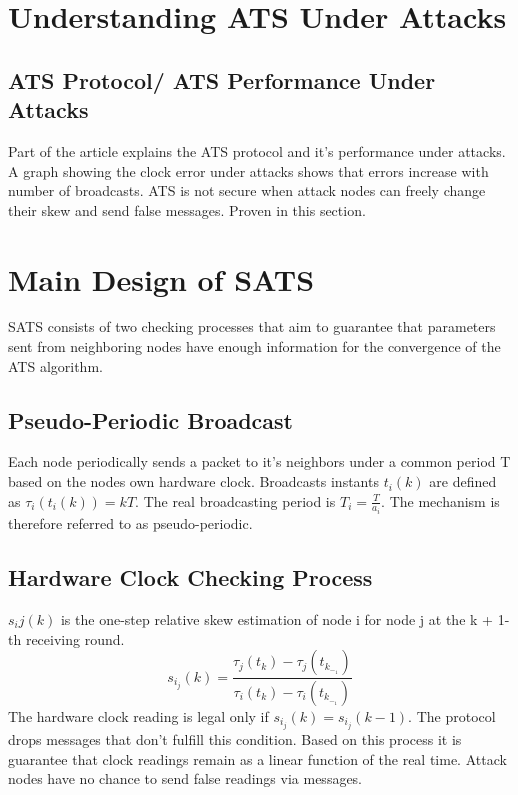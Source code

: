 \documentclass{article}
\begin{document}
\section{Understanding ATS Under Attacks}

\subsection{ATS Protocol/ ATS Performance Under Attacks}
Part of the article explains the ATS protocol and it's performance under attacks. A graph showing the clock error under attacks shows that errors increase with number of broadcasts. ATS is not secure when attack nodes can freely change their skew and send false messages. Proven in this section.

\section{Main Design of SATS}
SATS consists of two checking processes that aim to guarantee that parameters sent from neighboring nodes have enough information for the convergence of the ATS algorithm.

\subsection{Pseudo-Periodic Broadcast}
Each node periodically sends a packet to it's neighbors under a common period T based on the nodes own hardware clock. Broadcasts instants $t_i(k)$ are defined as $\tau_i(t_i(k)) = kT$. The real broadcasting period is $T_i = \frac{T}{a_i}$. The mechanism is therefore referred to as pseudo-periodic.

\subsection{Hardware Clock Checking Process}
$s_ij(k)$ is the one-step relative skew estimation of node i for node j at the k + 1-th receiving round. 
\begin{equation}
    s_i_j(k) = \frac{\tau_j(t_k) - \tau_j(t_k_-_1)}{\tau_i(t_k) - \tau_i(t_k_-_1)} \nonumber
\end{equation}
The hardware clock reading is legal only if $s_i_j(k) = s_i_j(k-1)$. The protocol drops messages that don't fulfill this condition. Based on this process it is guarantee that clock readings remain as a linear function of the real time. Attack nodes have no chance to send false readings via messages.
\end{document}
